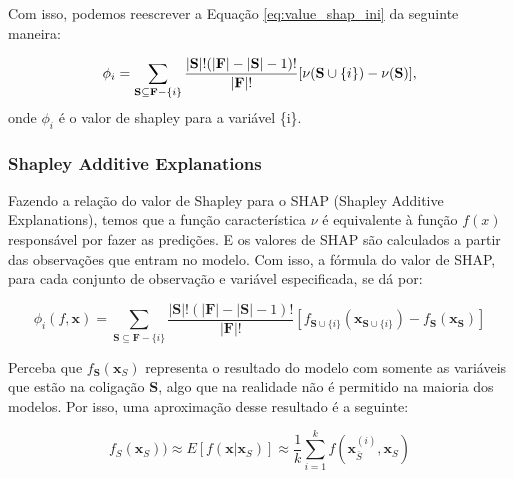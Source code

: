 Com isso, podemos reescrever a Equação \ref{eq:value_shap_ini} da seguinte maneira:

\[
\phi_i= 
\sum_{\textbf{S} \subseteq  \textbf{F} - \{i\}}
\frac{|\textbf{S}|!(|\textbf{F}| - |\textbf{S}| - 1)!}{|\textbf{F}|!}
[\nu(\textbf{S}\cup\{i\}) - \nu(\textbf{\textbf{S}})],
\]
\hspace{1.5cm} onde $\phi_i$ é o valor de shapley para a variável \{i\}.

\subsubsection{Shapley Additive Explanations}

Fazendo a relação do valor de Shapley para o SHAP (Shapley Additive Explanations), temos que a função característica $\nu$ é equivalente à função $f(x)$ responsável por fazer as predições. E os valores de SHAP são calculados a partir das observações que entram no modelo. Com isso, a fórmula do valor de SHAP, para cada conjunto de observação e variável especificada, se dá por:

\[
\phi_i(f,\textbf{x})= 
\sum_{\textbf{S} \subseteq  \textbf{F} - \{i\}}
\frac{|\textbf{S}|!(|\textbf{F}| - |\textbf{S}| - 1)!}{|\textbf{F}|!}
[f_{\textbf{S}\cup\{i\}}(\textbf{x}_{\textbf{S}\cup\{i\}}) - f_{\textbf{S}}(\textbf{x}_{\textbf{S}})
]
\]

Perceba que $f_\textbf{S}(\textbf{x}_S)$ representa o resultado do modelo com somente as variáveis que estão na coligação $\textbf{S}$, algo que na realidade não é permitido na maioria dos modelos. Por isso, uma aproximação desse resultado é a seguinte:

\begin{equation}    
f_S(\textbf{x}_S)) \approx E[f(\textbf{x}|\textbf{x}_S)] \approx 
\frac{1}{k} \sum_{i=1}^{k}
f(\textbf{x}_{\bar{S}}^{(i)}, \textbf{x}_S)
\label{eq:SHAP_detalhado}
\end{equation}


